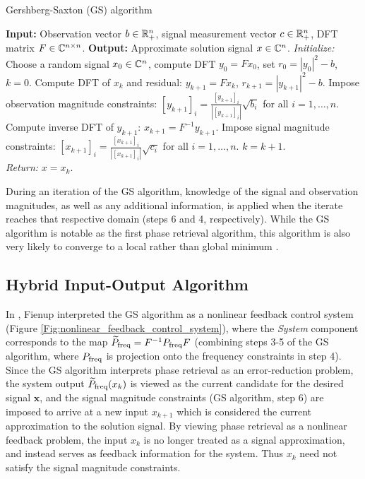 \begin{algorithm}[H]
\caption{Gershberg-Saxton (GS) algorithm}	\label{Alg:GS}

\begin{algorithmic}[1]
	\Statex 	\textbf{Input:} Observation vector $b \in {\mathbb R}^n_+$, signal measurement vector $c \in {\mathbb R}^n_+$, DFT matrix $F \in {\mathbb C}^{n \times n}$.
	\Statex 	\textbf{Output:} Approximate solution signal $x \in {\mathbb C}^n$.
	\State 		\textit{Initialize:} Choose a random signal $x_0 \in {\mathbb C}^n$, compute DFT $y_0 = F x_0$, set $r_0=|y_0|^2 - b$, $k = 0$.
		\State 	Compute DFT of $x_k$ and residual: $y_{k+1} = F x_k$, $r_{k+1} = |y_{k+1}|^2 - b$.
		\State	Impose observation magnitude constraints: $[y_{k+1}]_i = \frac{[y_{k+1}]_i}{|[y_{k+1}]_i|} \sqrt{b_i}$ for all $i = 1, \ldots, n$.
		\State	Compute inverse DFT of $y_{k+1}$: $x_{k+1} = F^{-1} y_{k+1}$.
		\State	Impose signal magnitude constraints: $[x_{k+1}]_i = \frac{[x_{k+1}]_i}{|[x_{k+1}]_i|} \sqrt{c_i}$ for all $i = 1, \ldots, n$.
		\State	$k = k + 1$.
	\EndWhile	\\
	\textit{Return:} $x = x_k$.
\end{algorithmic}
\end{algorithm}

During an iteration of the GS algorithm, knowledge of the signal and observation magnitudes, as well as any additional information, is applied when the iterate reaches that respective domain (steps 6 and 4, respectively).  
While the GS algorithm is notable as the first phase retrieval algorithm, this algorithm is also very likely to converge to a local rather than global minimum \cite{DBLP:journals/corr/JaganathanEH15a}.



\subsection{Hybrid Input-Output Algorithm}

In \cite{Fienup82},  Fienup interpreted the GS algorithm as a nonlinear feedback control system (Figure \ref{Fig:nonlinear_feedback_control_system}), where the \textit{System} component corresponds to the map $\widetilde{P}_\textnormal{freq} = F^{-1} P_\textnormal{freq} F$ (combining steps 3-5 of the GS algorithm, where $P_\textnormal{freq}$ is projection onto the frequency constraints in step 4).  
Since the GS algorithm interprets phase retrieval as an error-reduction problem, the system output $\widetilde{P}_\textnormal{freq}(x_k)$ is viewed as the current candidate for the desired signal $\mathbf{x}$, and the signal magnitude constraints (GS algorithm, step 6) are imposed to arrive at a new input $x_{k+1}$ which is considered the current approximation to the solution signal.  
By viewing phase retrieval as a nonlinear feedback problem, the input $x_k$ is no longer treated as a signal approximation, and instead serves as feedback information for the system.  Thus $x_k$ need not satisfy the signal magnitude constraints.


